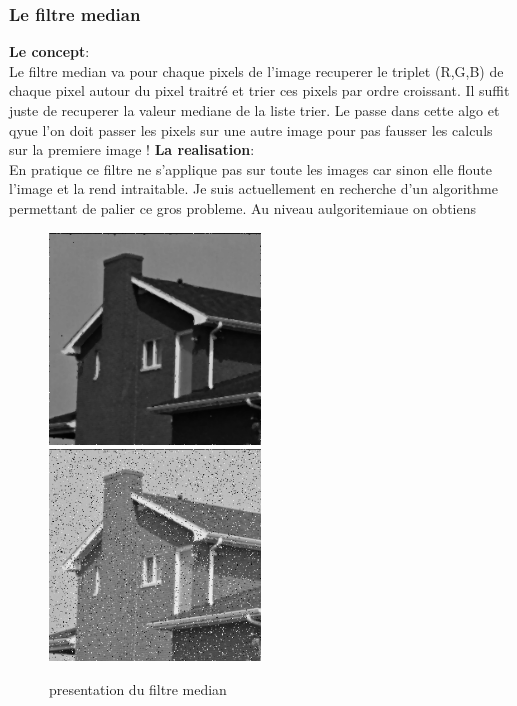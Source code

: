 \documentclass{article}
\begin{document}
\subsubsection{Le filtre median}
\textbf{Le concept}:\\
Le filtre median va pour chaque pixels de l'image recuperer le triplet (R,G,B) de chaque pixel autour du pixel traitré et trier ces pixels par ordre croissant. Il suffit juste de recuperer la valeur mediane de la liste trier. Le passe dans cette algo et qyue l'on doit passer les pixels sur une autre image pour pas fausser les calculs sur la premiere image !
\vspace{0.8cm}
\textbf{La realisation}:\\
En pratique ce filtre ne s'applique pas sur toute les images car sinon elle floute l'image et la rend intraitable. Je suis actuellement en recherche d'un algorithme permettant de palier ce gros probleme. Au niveau aulgoritemiaue on obtiens
\vspace{0.8cm}
\begin{figure}[h]
\includegraphics[width=0.50\textwidth]{img/house.png}
\includegraphics[width=0.50\textwidth]{img/house.jpg}
\caption{presentation du filtre median}
\end{figure}
\newpage
\end{document}
